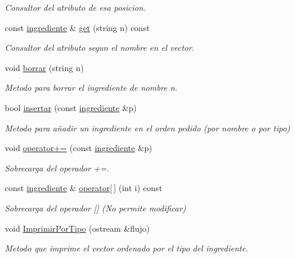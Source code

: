 \begin{DoxyCompactItemize}
\begin{DoxyCompactList}\small\item\em Consultor del atributo de esa posicion. \end{DoxyCompactList}\item 
const \hyperlink{classingrediente}{ingrediente} \& \hyperlink{classingredientes_aae670bf5dc762313dff281c7c6aa1b4f}{get} (string n) const
\begin{DoxyCompactList}\small\item\em Consultor del atributo segun el nombre en el vector. \end{DoxyCompactList}\item 
void \hyperlink{classingredientes_a71bde8efdf96c22f0f27ab9cc6e50466}{borrar} (string n)
\begin{DoxyCompactList}\small\item\em Metodo para borrar el ingrediente de nombre n. \end{DoxyCompactList}\item 
bool \hyperlink{classingredientes_a7633d03cdda31180994b63090ff9dd11}{insertar} (const \hyperlink{classingrediente}{ingrediente} \&p)
\begin{DoxyCompactList}\small\item\em Metodo para añadir un ingrediente en el orden pedido (por nombre o por tipo) \end{DoxyCompactList}\item 
void \hyperlink{classingredientes_a24ea8c982877578bff6e0f450c4b79a6}{operator+=} (const \hyperlink{classingrediente}{ingrediente} \&p)
\begin{DoxyCompactList}\small\item\em Sobrecarga del operador +=. \end{DoxyCompactList}\item 
const \hyperlink{classingrediente}{ingrediente} \& \hyperlink{classingredientes_a4d26f4035049ca7fb9506df48895cc4f}{operator\mbox{[}$\,$\mbox{]}} (int i) const
\begin{DoxyCompactList}\small\item\em Sobrecarga del operador \mbox{[}\mbox{]} (No permite modificar) \end{DoxyCompactList}\item 
void \hyperlink{classingredientes_a683d032576cbc230c210aa51cdbcc93e}{Imprimir\+Por\+Tipo} (ostream \&flujo)
\begin{DoxyCompactList}\small\item\em Metodo que imprime el vector ordenado por el tipo del ingrediente. \end{DoxyCompactList}\item 

\end{DoxyCompactItemize}
